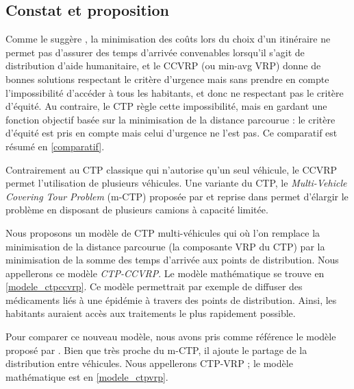\documentclass[5p,authoryear]{elsarticle}
\begin{document}
\subsection{Constat et proposition}
Comme le suggère \cite{campbell_routing_2008}, la minimisation des coûts lors du choix d’un itinéraire ne permet pas d’assurer des temps d’arrivée convenables lorsqu’il s’agit de distribution d’aide humanitaire, et le CCVRP (ou min-avg VRP) donne de bonnes solutions respectant le critère d'urgence mais sans prendre en compte l'impossibilité d'accéder à tous les habitants, et donc ne respectant pas le critère d'équité. Au contraire, le CTP règle cette impossibilité, mais en gardant une fonction objectif basée sur la minimisation de la distance parcourue : le critère d'équité est pris en compte mais celui d'urgence ne l'est pas. Ce comparatif est résumé en \cref{comparatif}.

Contrairement au CTP classique qui n'autorise qu'un seul véhicule, le CCVRP permet l'utilisation de plusieurs véhicules. Une variante du CTP, le \emph{Multi-Vehicle Covering Tour Problem} (m-CTP)  proposée par \cite{hachicha_heuristics_2000} et reprise dans \cite{naji-azimi_covering_2012} permet d'élargir le problème en disposant de plusieurs camions à capacité limitée.


Nous proposons un modèle de CTP multi-véhicules qui où l'on remplace la minimisation de la distance parcourue (la composante VRP du CTP) par la minimisation de la somme des temps d'arrivée aux points de distribution. Nous appellerons ce modèle \emph{CTP-CCVRP}. Le modèle mathématique se trouve en \cref{modele_ctpccvrp}. Ce modèle permettrait par exemple de diffuser des médicaments liés à une épidémie à travers des points de distribution. Ainsi, les habitants auraient accès aux traitements le plus rapidement possible.

Pour comparer ce nouveau modèle, nous avons pris comme référence le modèle proposé par \cite{naji-azimi_covering_2012}. Bien que très proche du m-CTP, il ajoute le partage de la distribution entre véhicules. Nous appellerons CTP-VRP ; le modèle mathématique est en \cref{modele_ctpvrp}.
\end{document}
